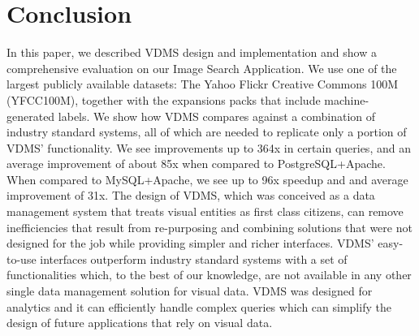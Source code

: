 \section{Conclusion}
In this paper, we described VDMS design and implementation and
show a comprehensive evaluation on our Image Search Application.
We use one of the largest publicly available datasets:
The Yahoo Flickr Creative Commons 100M (YFCC100M),
together with the expansions packs that include
machine-generated labels.
We show how VDMS compares against a combination of
industry standard systems, all of which are needed to
replicate only a portion of VDMS' functionality.
We see improvements up to 364x in certain queries,
and an average improvement of about 85x when compared to PostgreSQL+Apache.
When compared to MySQL+Apache, we see up to 96x speedup
and and average improvement of 31x.
The design of VDMS, which was conceived as a
data management system that treats visual entities
as first class citizens, can remove inefficiencies
that result from re-purposing and combining solutions
that were not designed for the job while providing
simpler and richer interfaces.
VDMS' easy-to-use interfaces outperform industry standard systems
with a set of functionalities which, to the best of our knowledge,
are not available in any other single data management solution for visual data.
VDMS was designed for analytics and it can efficiently handle complex queries
which can simplify the design of future applications that rely on visual data.
